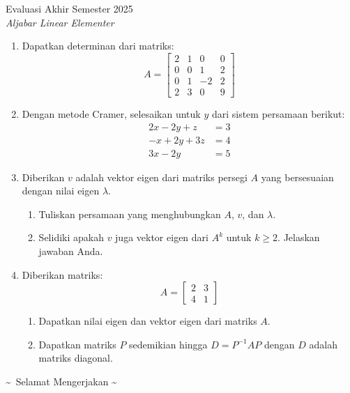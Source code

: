\documentclass[12pt]{article}
\begin{document}
\begin{center}
    {Evaluasi Akhir Semester 2025} \\
    \textit{Aljabar Linear Elementer} \\
\end{center}

\vspace{0.5cm}

\begin{enumerate}
    \item Dapatkan determinan dari matriks:
    \[
    A = \begin{bmatrix}
    2 & 1 & 0 & 0 \\
    0 & 0 & 1 & 2 \\
    0 & 1 & -2 & 2 \\
    2 & 3 & 0 & 9
    \end{bmatrix}
    \]

    \item Dengan metode Cramer, selesaikan untuk $y$ dari sistem persamaan berikut:
    \[
    \begin{aligned}
    2x - 2y + z &= 3 \\
    -x + 2y + 3z &= 4 \\
    3x - 2y &= 5
    \end{aligned}
    \]

    \item Diberikan $v$ adalah vektor eigen dari matriks persegi $A$ yang bersesuaian dengan nilai eigen $\lambda$.
    \begin{enumerate}[label=\alph*.]
        \item Tuliskan persamaan yang menghubungkan $A$, $v$, dan $\lambda$.
        \item Selidiki apakah $v$ juga vektor eigen dari $A^k$ untuk $k \geq 2$. Jelaskan jawaban Anda.
    \end{enumerate}

    \item Diberikan matriks:
    \[
    A = \begin{bmatrix}
    2 & 3 \\
    4 & 1
    \end{bmatrix}
    \]
    \begin{enumerate}[label=\alph*.]
        \item Dapatkan nilai eigen dan vektor eigen dari matriks $A$.
        \item Dapatkan matriks $P$ sedemikian hingga $D = P^{-1} A P$ dengan $D$ adalah matriks diagonal.
    \end{enumerate}
\end{enumerate}

\vspace{1cm}
\begin{center}
    \textasciitilde\ Selamat Mengerjakan \textasciitilde
\end{center}
\end{document}
